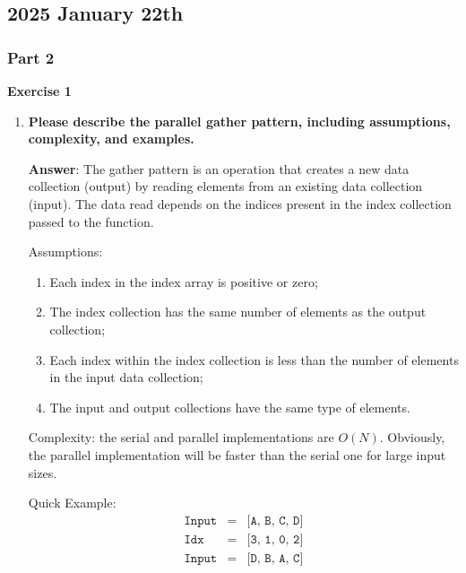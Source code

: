 \subsection{2025 January 22th}

\subsubsection{Part 2}

\begin{flushleft}
    \textcolor{Green3}{ \textbf{Exercise 1}}
\end{flushleft}
\begin{enumerate}[label=\Alph*.]
    \item \textcolor{Green3}{\textbf{%
        Please describe the parallel gather pattern, including assumptions, complexity, and examples.
    }}

    \textbf{Answer}: The gather pattern is an operation that creates a new data collection (output) by reading elements from an existing data collection (input). The data read depends on the indices present in the index collection passed to the function.

    Assumptions:
    \begin{enumerate}
        \item Each index in the index array is positive or zero;
        \item The index collection has the same number of elements as the output collection;
        \item Each index within the index collection is less than the number of elements in the input data collection;
        \item The input and output collections have the same type of elements.
    \end{enumerate}

    Complexity: the serial and parallel implementations are $O\left(N\right)$. Obviously, the parallel implementation will be faster than the serial one for large input sizes.

    Quick Example:
    \begin{equation*}
        \begin{array}{rcl}
            \texttt{Input}  &=& \texttt{[A, B, C, D]} \\
            \texttt{Idx}    &=& \texttt{[3, 1, 0, 2]} \\
            \texttt{Input}  &=& \texttt{[D, B, A, C]}
        \end{array}
    \end{equation*}


\end{enumerate}
